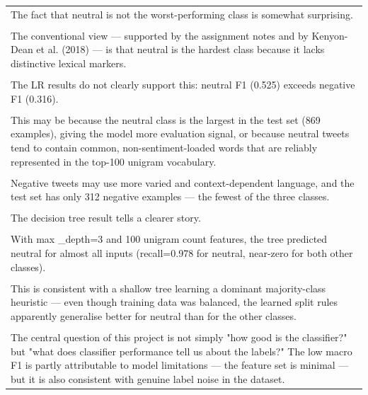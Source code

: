 \documentclass[11pt,a4paper,landscape]{article}
\begin{document}
\begin{longtable}{|p{\dimexpr\linewidth-2\tabcolsep-2\arrayrulewidth\relax}|}
\hline
\rule{0pt}{3.5cm} \\
\hline
The fact that neutral is not the worst-performing class is somewhat surprising. \\[2pt]
\hline
\rule{0pt}{3.5cm} \\
\hline
The conventional view --- supported by the assignment notes and by Kenyon-Dean et al. (2018) --- is that neutral is the hardest class because it lacks distinctive lexical markers. \\[2pt]
\hline
\rule{0pt}{3.5cm} \\
\hline
The LR results do not clearly support this: neutral F1 (0.525) exceeds negative F1 (0.316). \\[2pt]
\hline
\rule{0pt}{3.5cm} \\
\hline
This may be because the neutral class is the largest in the test set (869 examples), giving the model more evaluation signal, or because neutral tweets tend to contain common, non-sentiment-loaded words that are reliably represented in the top-100 unigram vocabulary. \\[2pt]
\hline
\rule{0pt}{3.5cm} \\
\hline
Negative tweets may use more varied and context-dependent language, and the test set has only 312 negative examples --- the fewest of the three classes. \\[2pt]
\hline
\rule{0pt}{3.5cm} \\
\hline
The decision tree result tells a clearer story. \\[2pt]
\hline
\rule{0pt}{3.5cm} \\
\hline
With max \_depth=3 and 100 unigram count features, the tree predicted neutral for almost all inputs (recall=0.978 for neutral, near-zero for both other classes). \\[2pt]
\hline
\rule{0pt}{3.5cm} \\
\hline
This is consistent with a shallow tree learning a dominant majority-class heuristic --- even though training data was balanced, the learned split rules apparently generalise better for neutral than for the other classes. \\[2pt]
\hline
\rule{0pt}{3.5cm} \\
\hline
The central question of this project is not simply "how good is the classifier?" but "what does classifier performance tell us about the labels?" The low macro F1 is partly attributable to model limitations --- the feature set is minimal --- but it is also consistent with genuine label noise in the dataset. \\[2pt]

\end{longtable}
\end{document}
